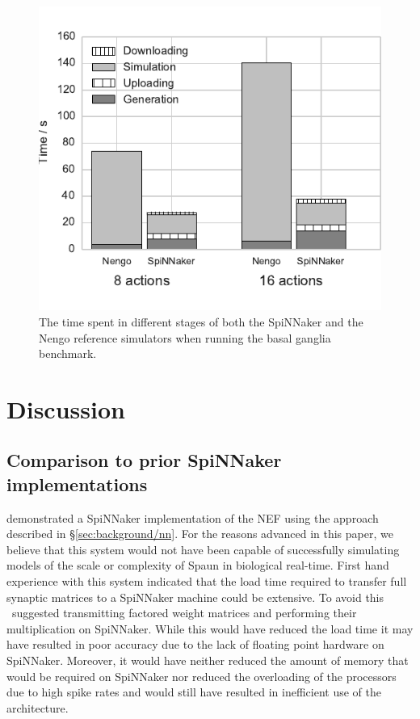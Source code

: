 \documentclass[conference]{IEEEtran}
\begin{document}
  \begin{figure}[!t]
    \includegraphics{figures/spa_wall_clock}
    \caption{The time spent in different stages of both the SpiNNaker and the Nengo reference simulators when running the basal ganglia benchmark. }
    \label{fig:results/spa-wall-clock}
  \end{figure}
  \section{Discussion}

  \subsection{Comparison to prior SpiNNaker implementations}

  \textcite{Galluppi2012} demonstrated a SpiNNaker implementation of the NEF using the approach described in \S\ref{sec:background/nn}.
  For the reasons advanced in this paper, we believe that this system would not have been capable of successfully simulating models of the scale or complexity of Spaun in biological real-time.
  First hand experience with this system indicated that the load time required to transfer full synaptic matrices to a SpiNNaker machine could be extensive. 
To avoid this \citeauthor*{Galluppi2012}\ suggested transmitting factored weight matrices and performing their multiplication on SpiNNaker.
  While this would have reduced the load time it may have resulted in poor accuracy due to the lack of floating point hardware on SpiNNaker.
  Moreover, it would have neither reduced the amount of memory that would be required on SpiNNaker nor reduced the overloading of the processors due to high spike rates and would still have resulted in inefficient use of the architecture.
\end{document}
